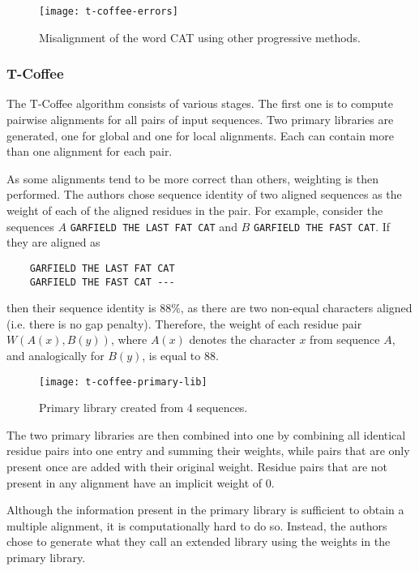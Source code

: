 \begin{figure}[h]
\centering
\texttt{[image: t-coffee-errors]}
\caption{Misalignment of the word CAT using other progressive methods. \citep[Figure~2(a)]{t_coffee}}
\end{figure}

\subsubsection{T-Coffee}

The T-Coffee algorithm consists of various stages. The first one is to compute pairwise alignments for all pairs of input sequences.
Two primary libraries are generated, one for global and one for local alignments. Each can contain more than one alignment for each pair.

As some alignments tend to be more correct than others, weighting is then performed. The authors chose sequence identity of two aligned
sequences as the weight of each of the aligned residues in the pair. For example, consider the sequences $A$ \verb|GARFIELD THE LAST FAT CAT|
and $B$ \verb|GARFIELD THE FAST CAT|. If they are aligned as

\begin{verbatim}
    GARFIELD THE LAST FAT CAT
    GARFIELD THE FAST CAT ---
\end{verbatim}

then their sequence identity is 88\%, as there are two non-equal characters aligned (i.e. there is no gap penalty). Therefore, the weight of
each residue pair $W(A(x), B(y))$, where $A(x)$ denotes the character $x$ from sequence $A$, and analogically for $B(y)$, is equal to 88.

\begin{figure}[h]
\centering
\texttt{[image: t-coffee-primary-lib]}
\caption{Primary library created from 4 sequences. \citep[Figure~2(b)]{t_coffee}}
\end{figure}

The two primary libraries are then combined into one by combining all identical residue pairs into one entry and summing their weights, while
pairs that are only present once are added with their original weight. Residue pairs that are not present in any alignment have an implicit weight
of 0.

Although the information present in the primary library is sufficient to obtain a multiple alignment, it is computationally hard to do so. Instead,
the authors chose to generate what they call an extended library using the weights in the primary library.

